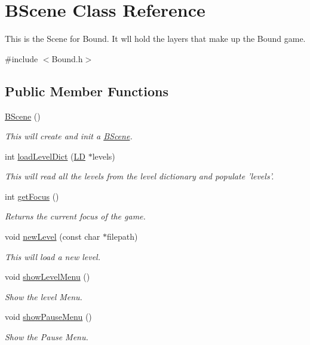 \hypertarget{class_b_scene}{\section{\-B\-Scene \-Class \-Reference}
\label{class_b_scene}
}


\-This is the \-Scene for \-Bound. \-It wll hold the layers that make up the \-Bound game.  




{\ttfamily \#include $<$\-Bound.\-h$>$}

\subsection*{\-Public \-Member \-Functions}
\begin{DoxyCompactItemize}
\item 
\hyperlink{class_b_scene_a814659a27cecfe7e5aefc32081d0f3a5}{\-B\-Scene} ()
\begin{DoxyCompactList}\small\item\em \-This will create and init a \hyperlink{class_b_scene}{\-B\-Scene}. \end{DoxyCompactList}\item 
int \hyperlink{class_b_scene_a94e762ddd0893943d05d58eac2f6d641}{load\-Level\-Dict} (\hyperlink{struct_l_d}{\-L\-D} $\ast$levels)
\begin{DoxyCompactList}\small\item\em \-This will read all the levels from the level dictionary and populate 'levels'. \end{DoxyCompactList}\item 
int \hyperlink{class_b_scene_ae8759c51e7bcd9888f3035cbcd9d675c}{get\-Focus} ()
\begin{DoxyCompactList}\small\item\em \-Returns the current focus of the game. \end{DoxyCompactList}\item 
void \hyperlink{class_b_scene_a79117c8d522c8907c474b8448b5e486b}{new\-Level} (const char $\ast$filepath)
\begin{DoxyCompactList}\small\item\em \-This will load a new level. \end{DoxyCompactList}\item 
void \hyperlink{class_b_scene_a98a3fdedfb94c433624c0ce664adb343}{show\-Level\-Menu} ()
\begin{DoxyCompactList}\small\item\em \-Show the level \-Menu. \end{DoxyCompactList}\item 
void \hyperlink{class_b_scene_a2817197ebb69c55473bd50808a66a27f}{show\-Pause\-Menu} ()
\begin{DoxyCompactList}\small\item\em \-Show the \-Pause \-Menu. \end{DoxyCompactList}\end{DoxyCompactItemize}
